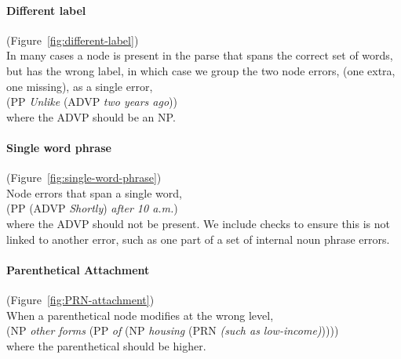 \paragraph{Different label} (Figure~\ref{fig:different-label}) \\
In many cases a node is present in the parse that spans the correct set of words, but has the wrong label, in which case we group the two node errors, (one extra, one missing), as a single error, \myeg \\
(PP \emph{Unlike} (ADVP \emph{two years ago})) \\
where the ADVP should be an NP.

\paragraph{Single word phrase} (Figure~\ref{fig:single-word-phrase}) \\
Node errors that span a single word, \myeg \\
(PP (ADVP \emph{Shortly}) \emph{after 10 a.m.\@\xspace}) \\
where the ADVP should not be present.
We include checks to ensure this is not linked to another error, such as one part of a set of internal noun phrase errors.

\paragraph{Parenthetical Attachment} (Figure~\ref{fig:PRN-attachment}) \\
When a parenthetical node modifies at the wrong level, \myeg \\
(NP \emph{other forms} (PP \emph{of} (NP \emph{housing} (PRN \emph{(such as low-income)})))) \\
where the parenthetical should be higher.

\begin{landscape}
\begin{figure}
\begin{minipage}[b]{4in}
\centering

\end{minipage}\hfill
\begin{minipage}[b]{4in}
\centering

\end{minipage}
\end{figure}
\end{landscape}

\begin{figure}
\centering

\end{figure}

